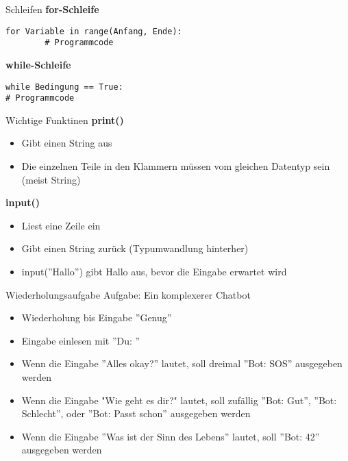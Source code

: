 \begin{frame}[fragile]{Schleifen}
\textbf{for-Schleife}
\begin{lstlisting}
for Variable in range(Anfang, Ende):
		# Programmcode
\end{lstlisting}

\textbf{while-Schleife}
\begin{lstlisting}
while Bedingung == True:
# Programmcode
\end{lstlisting}
\end{frame}

\begin{frame}[fragile]{Wichtige Funktinen}
\textbf{print()}
\begin{itemize}
	\item Gibt einen String aus
	\item Die einzelnen Teile in den Klammern müssen vom gleichen Datentyp sein (meist String)
\end{itemize}

\textbf{input()}
\begin{itemize}
	\item Liest eine Zeile ein
	\item Gibt einen String zurück (Typumwandlung hinterher)
	\item input(''Hallo'') gibt Hallo aus, bevor die Eingabe erwartet wird
\end{itemize}
\end{frame}


\begin{frame}[fragile]{Wiederholungsaufgabe}
	Aufgabe: Ein komplexerer Chatbot\\
	\begin{itemize}
		\item Wiederholung bis Eingabe ''Genug''
		\item Eingabe einlesen mit ''Du: ''
		\item Wenn die Eingabe ''Alles okay?'' lautet, soll dreimal ''Bot: SOS'' ausgegeben werden
		\item Wenn die Eingabe "Wie geht es dir?" lautet, soll zufällig ''Bot: Gut'', ''Bot: Schlecht'', oder ''Bot: Passt schon'' ausgegeben werden
		\item Wenn die Eingabe ''Was ist der Sinn des Lebens'' lautet, soll ''Bot: 42'' ausgegeben werden
	\end{itemize}
	
\end{frame}

